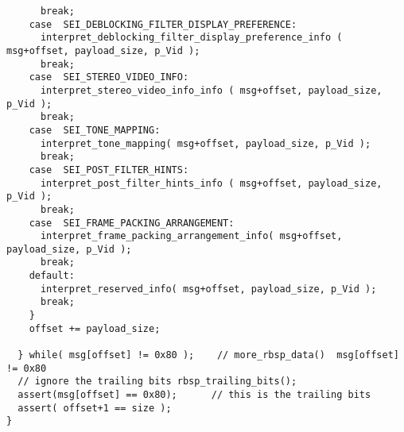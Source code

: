 \begin{lstlisting}
      break;
    case  SEI_DEBLOCKING_FILTER_DISPLAY_PREFERENCE:
      interpret_deblocking_filter_display_preference_info ( msg+offset, payload_size, p_Vid );
      break;
    case  SEI_STEREO_VIDEO_INFO:
      interpret_stereo_video_info_info ( msg+offset, payload_size, p_Vid );
      break;
    case  SEI_TONE_MAPPING:
      interpret_tone_mapping( msg+offset, payload_size, p_Vid );
      break;
    case  SEI_POST_FILTER_HINTS:
      interpret_post_filter_hints_info ( msg+offset, payload_size, p_Vid );
      break;
    case  SEI_FRAME_PACKING_ARRANGEMENT:
      interpret_frame_packing_arrangement_info( msg+offset, payload_size, p_Vid );
      break;
    default:
      interpret_reserved_info( msg+offset, payload_size, p_Vid );
      break;    
    }
    offset += payload_size;

  } while( msg[offset] != 0x80 );    // more_rbsp_data()  msg[offset] != 0x80
  // ignore the trailing bits rbsp_trailing_bits();
  assert(msg[offset] == 0x80);      // this is the trailing bits
  assert( offset+1 == size );
}

\end{lstlisting}

